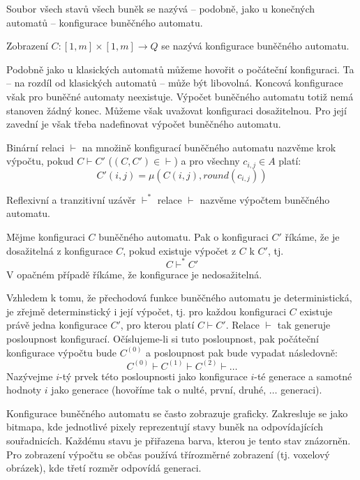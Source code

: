 \documentclass[a4paper,10pt]{article}
\begin{document}
Soubor všech stavů všech buněk se nazývá -- podobně, jako u konečných automatů -- konfigurace buněčného automatu.

\begin{definition}
 Zobrazení $C: [1,m] \times [1,m] \rightarrow Q$ se nazývá konfigurace buněčného automatu.
\end{definition}

Podobně jako u klasických automatů můžeme hovořit o počáteční konfiguraci. Ta -- na rozdíl od klasických automatů -- může být libovolná. Koncová konfigurace však pro buněčné automaty neexistuje. Výpočet buněčného automatu totiž nemá stanoven žádný konec. Můžeme však uvažovat konfiguraci dosažitelnou. Pro její zavední je však třeba nadefinovat výpočet buněčného automatu.

\begin{definition}
 Binární relaci $\vdash$ na množině konfigurací buněčného automatu nazvěme krok výpočtu, pokud $C \vdash C'$ ($(C, C') \in \vdash$) a pro všechny $c_{i,j} \in A$ platí:
 $$
  C'(i,j) = \mu(C(i,j), round(c_{i,j}))
 $$
 
 Reflexivní a tranzitivní uzávěr $\vdash^*$ relace $\vdash$ nazvěme výpočtem buněčného automatu.
\end{definition}

\begin{definition}
 Mějme konfiguraci $C$ buněčného automatu. Pak o konfiguraci $C'$ říkáme, že je dosažitelná z konfigurace $C$, pokud existuje výpočet z $C$ k $C'$, tj.
 $$
  C \vdash^* C'
 $$
 V opačném případě říkáme, že konfigurace je nedosažitelná.
\end{definition}

Vzhledem k tomu, že přechodová funkce buněčného automatu je deterministická, je zřejmě determinstický i její výpočet, tj. pro každou konfiguraci $C$ existuje právě jedna konfigurace $C'$, pro kterou platí $C \vdash C'$. Relace $\vdash$ tak generuje posloupnost konfigurací. Očíslujeme-li si tuto posloupnost, pak počáteční konfigurace výpočtu bude $C^{(0)}$ a posloupnost pak bude vypadat následovně:
$$
  C^{(0)} \vdash C^{(1)} \vdash C^{(2)} \vdash \dots
$$
Nazývejme $i$-tý prvek této posloupnosti jako konfigurace $i$-té generace a samotné hodnoty $i$ jako generace (hovoříme tak o nulté, první, druhé, $\dots$ generaci).

Konfigurace buněčného automatu se často zobrazuje graficky. Zakresluje se jako bitmapa, kde jednotlivé pixely reprezentují stavy buněk na odpovídajících souřadnicích. Každému stavu je přiřazena barva, kterou je tento stav znázorněn. Pro zobrazení výpočtu se občas používá třírozměrné zobrazení (tj. voxelový obrázek), kde třetí rozměr odpovídá generaci.
\end{document}
